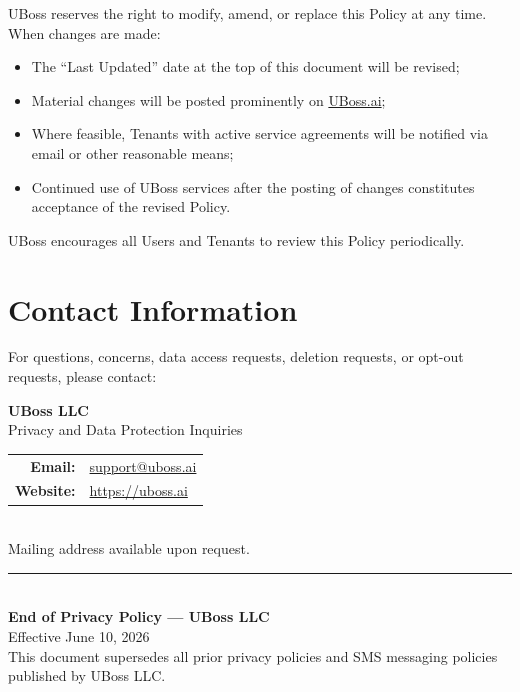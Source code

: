 \documentclass[11pt, letterpaper]{article}
\begin{document}
UBoss reserves the right to modify, amend, or replace this Policy at any time. When
changes are made:

\begin{itemize}
    \item The ``Last Updated'' date at the top of this document will be revised;
    \item Material changes will be posted prominently on
          \href{https://uboss.ai}{UBoss.ai};
    \item Where feasible, Tenants with active service agreements will be notified via
          email or other reasonable means;
    \item Continued use of UBoss services after the posting of changes constitutes
          acceptance of the revised Policy.
\end{itemize}

UBoss encourages all Users and Tenants to review this Policy periodically.

\section{Contact Information}
\label{sec:contact}

For questions, concerns, data access requests, deletion requests, or opt-out requests,
please contact:

\begin{center}
\begin{tcolorbox}[keysummary, width=0.7\textwidth]
\begin{center}
\textbf{\large UBoss LLC}\\[0.3em]
Privacy and Data Protection Inquiries\\[1em]
\begin{tabular}{rl}
\textbf{Email:}   & \href{mailto:support@uboss.ai}{support@uboss.ai} \\
\textbf{Website:} & \href{https://uboss.ai}{https://uboss.ai} \\
\end{tabular}\\[0.8em]
{\small Mailing address available upon request.}
\end{center}
\end{tcolorbox}
\end{center}

\vspace{2em}

\begin{center}
\textcolor{ubossaccent}{\rule{0.6\textwidth}{1.5pt}}\\[1em]
{\large\textbf{End of Privacy Policy --- UBoss LLC}}\\[0.3em]
{\textcolor{ubossgray}{Effective June 10, 2026}}\\[0.3em]
{\small\textcolor{ubossgray}{This document supersedes all prior privacy policies and
SMS messaging policies published by UBoss LLC.}}
\end{center}
\end{document}
